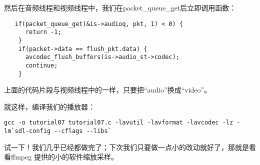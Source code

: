 然后在音频线程和视频线程中，我们在packet_queue_get后立即调用函数：

\begin{lstlisting}
   if(packet_queue_get(&is->audioq, pkt, 1) < 0) {
      return -1;
    }
    if(packet->data == flush_pkt.data) {
      avcodec_flush_buffers(is->audio_st->codec);
      continue;
    }
\end{lstlisting}

上面的代码片段与视频线程中的一样，只要把“audio”换成“video”。

就这样，编译我们的播放器：

\begin{lstlisting}
gcc -o tutorial07 tutorial07.c -lavutil -lavformat -lavcodec -lz -lm`sdl-config --cflags --libs`
\end{lstlisting}

试一下！我们几乎已经都做完了；下次我们只要做一点小的改动就好了，那就是看看ffmpeg 提供的小的软件缩放采样。

